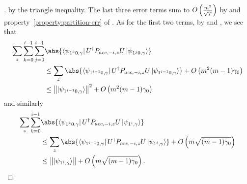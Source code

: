 \begin{proof}[]
	by the triangle inequality.
	The last three error terms sum to $O\left(\frac{m^2}{\sqrt{T}}\right)$ by  and property~\ref{property:partition-err} of .
	As for the first two terms, by  and , we see that
	\begin{align*}
		\sum_z \sum_{k=0}^{i-1}\sum_{j=0}^{i-1}
		&\abs{\bra{\psi_{1^k0,\gamma}}U^\dag  P_{acc,-i,z}U \ket{\psi_{1^j0,\gamma}}} \\
		&\leq\sum_z \abs{\bra{\psi_{1^{i-1}0,\gamma}}U^\dag  P_{acc,-i,z}U \ket{\psi_{1^{i-1}0,\gamma}}} + O\L(m^2(m-1)\gamma_0\R) \\
		&\leq\norm{\ket{\psi_{1^{i-1}0,\gamma}}}^2 + O\L(m^2(m-1)\gamma_0\R)
	\end{align*}
	and similarly
	\begin{align*}
		\sum_z\sum_{k=0}^{i-1}
		&\abs{\bra{\psi_{1^k0,\gamma}}U^\dag  P_{acc,-i,z}U \ket{\psi_{1^i,\gamma}}}\\
		&\leq\sum_z\abs{\bra{\psi_{1^{i-1}0,\gamma}}U^\dag  P_{acc,-i,z}U \ket{\psi_{1^i,\gamma}}}+O\L(m\sqrt{(m-1)\gamma_0}\R)\\
		&\leq\norm{\ket{\psi_{1^i,\gamma}}}+O\L(m\sqrt{(m-1)\gamma_0}\R).
	\end{align*}
\end{proof}




